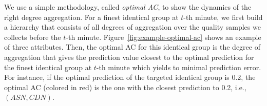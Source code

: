 We use a simple methodology, called {\it optimal AC}, to show the dynamics of the right degree aggregation. For a finest identical group at $t$-th minute, we first build a hierarchy that consists of all degrees of aggregation over the quality samples we collects before the $t$-th minute. Figure~\ref{fig:example-optimal-ac} shows an example of three attributes. 
Then, the optimal AC for this identical group is the degree of aggregation that gives the prediction value closest to the optimal prediction for the finest identical group at $t$-th minute which yields to minimal prediction error.
For instance, if the optimal prediction of the targeted identical group is 0.2, the optimal AC (colored in red) is the one with the closest prediction to 0.2, i.e., $(ASN, CDN)$. 


\begin{figure}[h!]
\centering
{}
\label{fig:optimal-ac-dynamics}
\end{figure}

